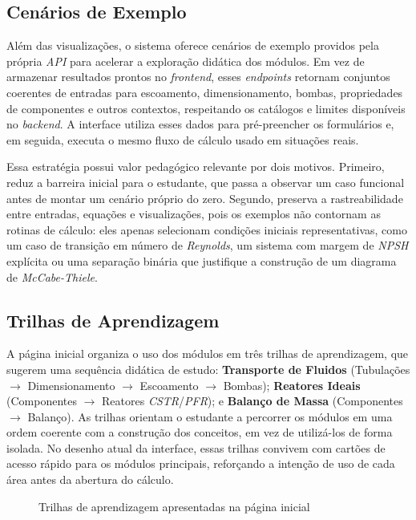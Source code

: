 \subsection{Cenários de Exemplo}

Além das visualizações, o sistema oferece cenários de exemplo providos pela própria \textit{API} para acelerar a exploração didática dos módulos. Em vez de armazenar resultados prontos no \textit{frontend}, esses \textit{endpoints} retornam conjuntos coerentes de entradas para escoamento, dimensionamento, bombas, propriedades de componentes e outros contextos, respeitando os catálogos e limites disponíveis no \textit{backend}. A interface utiliza esses dados para pré-preencher os formulários e, em seguida, executa o mesmo fluxo de cálculo usado em situações reais.

Essa estratégia possui valor pedagógico relevante por dois motivos. Primeiro, reduz a barreira inicial para o estudante, que passa a observar um caso funcional antes de montar um cenário próprio do zero. Segundo, preserva a rastreabilidade entre entradas, equações e visualizações, pois os exemplos não contornam as rotinas de cálculo: eles apenas selecionam condições iniciais representativas, como um caso de transição em número de \textit{Reynolds}, um sistema com margem de \textit{NPSH} explícita ou uma separação binária que justifique a construção de um diagrama de \textit{McCabe-Thiele}.

\subsection{Trilhas de Aprendizagem}

A página inicial organiza o uso dos módulos em três trilhas de aprendizagem, que sugerem uma sequência didática de estudo: \textbf{Transporte de Fluidos} (Tubulações $\rightarrow$ Dimensionamento $\rightarrow$ Escoamento $\rightarrow$ Bombas); \textbf{Reatores Ideais} (Componentes $\rightarrow$ Reatores \textit{CSTR}/\textit{PFR}); e \textbf{Balanço de Massa} (Componentes $\rightarrow$ Balanço). As trilhas orientam o estudante a percorrer os módulos em uma ordem coerente com a construção dos conceitos, em vez de utilizá-los de forma isolada. No desenho atual da interface, essas trilhas convivem com cartões de acesso rápido para os módulos principais, reforçando a intenção de uso de cada área antes da abertura do cálculo.

\begin{figure}[H]
    \centering
    \caption{Trilhas de aprendizagem apresentadas na página inicial}
    \label{fig:trilhas}
\end{figure}
